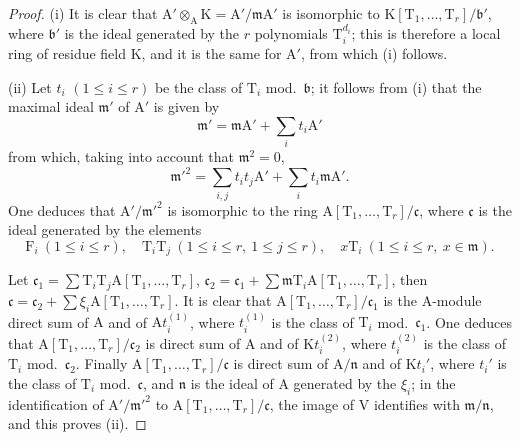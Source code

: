 \begin{proof}
(i) It is clear that $\mathrm{A}'\otimes_\mathrm{A}\mathrm{K}=\mathrm{A}'/\mathfrak{m}\mathrm{A}'$ is isomorphic to $\mathrm{K}[\mathrm{T}_1,\ldots,\mathrm{T}_r]/\mathfrak{b}'$, where $\mathfrak{b}'$ is the ideal generated by the $r$ polynomials $\mathrm{T}_i^{d_i}$; this is therefore a local ring of residue field $\mathrm{K}$, and it is the same for $\mathrm{A}'$, from which (i) follows.

(ii) Let $t_i$ $(1\leq i\leq r)$ be the class of $\mathrm{T}_i$ mod.~$\mathfrak{b}$; it follows from (i) that the maximal ideal $\mathfrak{m}'$ of $\mathrm{A}'$ is given by
\[
  \mathfrak{m}'=\mathfrak{m}\mathrm{A}'+\sum_i t_i\mathrm{A}'
\]
from which, taking into account that $\mathfrak{m}^2=0$,
\[
  \mathfrak{m}'^2=\sum_{i,j}t_it_j\mathrm{A}'+\sum_i t_i\mathfrak{m}\mathrm{A}'.
\]
One deduces that $\mathrm{A}'/\mathfrak{m}'^2$ is isomorphic to the ring $\mathrm{A}[\mathrm{T}_1,\ldots,\mathrm{T}_r]/\mathfrak{c}$, where $\mathfrak{c}$ is the ideal generated by the elements
\[
  \mathrm{F}_i\ (1\leq i\leq r),\quad \mathrm{T}_i\mathrm{T}_j\ (1\leq i\leq r,\ 1\leq j\leq r),\quad x\mathrm{T}_i\ (1\leq i\leq r,\ x\in\mathfrak{m}).
\]

Let $\mathfrak{c}_1=\sum\mathrm{T}_i\mathrm{T}_j\mathrm{A}[\mathrm{T}_1,\ldots,\mathrm{T}_r]$, $\mathfrak{c}_2=\mathfrak{c}_1+\sum\mathfrak{m}\mathrm{T}_i\mathrm{A}[\mathrm{T}_1,\ldots,\mathrm{T}_r]$, then $\mathfrak{c}=\mathfrak{c}_2+\sum\xi_i\mathrm{A}[\mathrm{T}_1,\ldots,\mathrm{T}_r]$.
It is clear that $\mathrm{A}[\mathrm{T}_1,\ldots,\mathrm{T}_r]/\mathfrak{c}_1$ is the $\mathrm{A}$-module direct sum of $\mathrm{A}$ and of $\mathrm{A}t_i^{(1)}$, where $t_i^{(1)}$ is the class of $\mathrm{T}_i$ mod.~$\mathfrak{c}_1$.
One deduces that $\mathrm{A}[\mathrm{T}_1,\ldots,\mathrm{T}_r]/\mathfrak{c}_2$ is direct sum of $\mathrm{A}$ and of $\mathrm{K}t_i^{(2)}$, where $t_i^{(2)}$ is the class of $\mathrm{T}_i$ mod.~$\mathfrak{c}_2$.
Finally $\mathrm{A}[\mathrm{T}_1,\ldots,\mathrm{T}_r]/\mathfrak{c}$ is direct sum of $\mathrm{A}/\mathfrak{n}$ and of $\mathrm{K}t_i'$, where $t_i'$ is the class of $\mathrm{T}_i$ mod.~$\mathfrak{c}$, and $\mathfrak{n}$ is the ideal of $\mathrm{A}$ generated by the $\xi_i$; in the identification of $\mathrm{A}'/\mathfrak{m}'^2$ to $\mathrm{A}[\mathrm{T}_1,\ldots,\mathrm{T}_r]/\mathfrak{c}$, the image of $\mathrm{V}$ identifies with $\mathfrak{m}/\mathfrak{n}$, and this proves (ii).
\end{proof}

